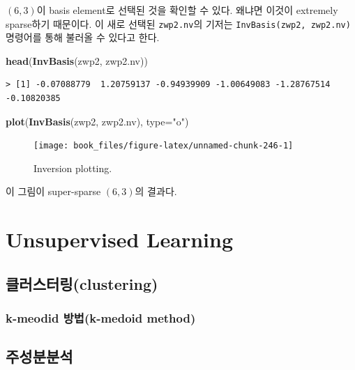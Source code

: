 \documentclass[b5paper,]{scrbook}
\makeatletter
\newenvironment{Shaded}{\begin{snugshade}}{\end{snugshade}}
\newcommand{\KeywordTok}[1]{\textcolor[rgb]{0.13,0.29,0.53}{\textbf{#1}}}
\newcommand{\DataTypeTok}[1]{\textcolor[rgb]{0.13,0.29,0.53}{#1}}
\newcommand{\StringTok}[1]{\textcolor[rgb]{0.31,0.60,0.02}{#1}}
\newcommand{\NormalTok}[1]{#1}
\theoremstyle{plain}
\theoremstyle{definition}
\numberwithin{equation}{section}
\newenvironment{kframe}{%
\medskip{}
\setlength{\fboxsep}{.8em}
 \def\at@end@of@kframe{}%
 \ifinner\ifhmode%
  \def\at@end@of@kframe{\end{minipage}}%
  \begin{minipage}{\columnwidth}%
 \fi\fi%
 \def\FrameCommand##1{\hskip\@totalleftmargin \hskip-\fboxsep
 \colorbox{shadecolor}{##1}\hskip-\fboxsep
     \hskip-\linewidth \hskip-\@totalleftmargin \hskip\columnwidth}%
 \MakeFramed {\advance\hsize-\width
   \@totalleftmargin\z@ \linewidth\hsize
   \@setminipage}}%
 {\par\unskip\endMakeFramed%
 \at@end@of@kframe}
\renewenvironment{Shaded}{\begin{kframe}}{\end{kframe}}
\makeatother
\begin{document}
\((6,3)\)이 basis element로 선택된 것을 확인할 수 있다. 왜냐면 이것이
extremely sparse하기 때문이다. 이 새로 선택된 \texttt{zwp2.nv}의 기저는
\texttt{InvBasis(zwp2,\ zwp2.nv)} 명령어를 통해 불러올 수 있다고 한다.

\begin{Shaded}
\begin{Highlighting}[]
\KeywordTok{head}\NormalTok{(}\KeywordTok{InvBasis}\NormalTok{(zwp2, zwp2.nv))}
\end{Highlighting}
\end{Shaded}

\begin{verbatim}
> [1] -0.07088779  1.20759137 -0.94939909 -1.00649083 -1.28767514 -0.10820385
\end{verbatim}

\begin{Shaded}
\begin{Highlighting}[]
\KeywordTok{plot}\NormalTok{(}\KeywordTok{InvBasis}\NormalTok{(zwp2, zwp2.nv), }\DataTypeTok{type=}\StringTok{"o"}\NormalTok{)}
\end{Highlighting}
\end{Shaded}

\begin{figure}

{\centering \texttt{[image: book\_files/figure-latex/unnamed-chunk-246-1]} 

}

\caption{Inversion plotting.}\label{fig:unnamed-chunk-246}
\end{figure}

이 그림이 super-sparse \((6,3)\)의 결과다.

\part{Unsupervised
Learning}\label{part-unsupervised-learning}

\chapter{클러스터링(clustering)}\label{clustering}

\section{k-meodid 방법(k-medoid method)}\label{k-meodid-k-medoid-method}

\chapter{주성분분석}\label{PCA}
\end{document}
